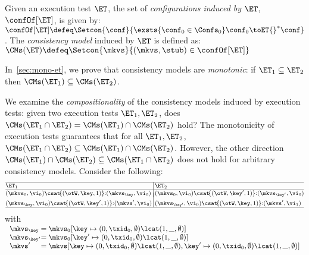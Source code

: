 \begin{definition}
\label{def:cm}
Given an execution test $\ET$,  
the set of \emph{configurations induced by $\ET$},  $\confOf[\ET]$, is   given by: 
\(
\confOf[\ET]\defeq 
\Setcon{\conf}{ 
	\exsts{\conf_0 \in \Confs_0}
	\conf_0 \toET{}^{*} \conf
}
\).
The \emph{consistency model} induced by $\ET$ is defined as:
\( 
\CMs(\ET) \defeq \Setcon{ \mkvs }{ (\mkvs, \stub) \in \confOf[\ET] }
\)
\end{definition}


\noindent In~\cref{sec:mono-et}, we prove that consistency models are 
\emph{monotonic}: 
if  $\ET_1 \subseteq \ET_2$ then $\CMs(\ET_1) \subseteq \CMs(\ET_2)$.

We examine the \emph{compositionality} of the consistency models induced by execution tests:  
\ie given two execution tests $\ET_1, \ET_2$, does 
$\CMs(\ET_1 \cap \ET_2) = \CMs(\ET_1) \cap \CMs(\ET_2)$ hold? 
The monotonicity of execution tests guarantees that 
 for all $\ET_1, \ET_2$, \( \CMs(\ET_1 \cap \ET_2) \subseteq \CMs(\ET_1) \cap \CMs(\ET_2) \). 
However, the other direction \( \CMs(\ET_1) \cap \CMs(\ET_2) \subseteq \CMs(\ET_1 \cap \ET_2) \) does not hold for arbitrary consistency models.
Consider the following:
%
\[
\small
\begin{array}{@{}l @{\hspace{2pt}} | @{\hspace{2pt}} l@{}}
    \hline
    \ET_1 & \ET_2 \\
%    
    \hline
    (\mkvs_{0}, \vi_{0}) \csat\! \{(\otW, \key, 1)\} {:} ( \mkvs_{\key}, \vi_{0})
    &
    (\mkvs_{0}, \vi_{0}) \csat\! \{(\otW, \key', 1)\} {:} ( \mkvs_{\key'}, \vi_{0}) 
    \vspace*{-7pt}\\\\
    (\mkvs_{\key}, \vi_{0}) \csat  \!\{(\otW, \key', 1)\} {:} (\mkvs',\vi_{0}) 
    &
    (\mkvs_{\key'}, \vi_{0}) \csat \!\{(\otW, \key, 1)\} {:} (\mkvs',\vi_{1}) 
    \\
\hline
\end{array}
\]%
%
with%
%
{
\(
\small
\begin{array}[t]{l@{} l}
    \mkvs_{\key} & = \mkvs_{0}[\key \mapsto (0, \txid_{0}, \emptyset) \lcat (1, \_, \emptyset)] \\
    \mkvs_{\key'} & = \mkvs_{0}[\key' \mapsto (0, \txid_{0}, \emptyset) \lcat (1, \_, \emptyset)] \\
    \mkvs' & = \mkvs[\key \mapsto (0, \txid_{0}, \emptyset) \lcat (1, \_, \emptyset) 
                ,\key' \mapsto (0, \txid_{0}, \emptyset) \lcat (1, \_, \emptyset)] \\
\end{array}
\)%
}%
%

